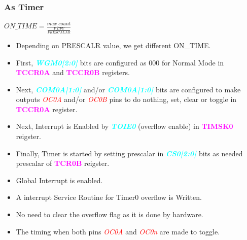 \documentclass{article}
\newcommand{\bitFormat}[1]{\emph{\textbf{\textcolor{cyan}{#1}}}}
\newcommand{\regFormat}[1]{\textbf{\textcolor{magenta}{#1}}}
\newcommand{\pinFormat}[1]{\emph{\textcolor{red}{#1}}}
\begin{document}
\subsubsection{As Timer}
\begin{center}
    $ON\_TIME = \frac{max\_count}{\frac{F\_CPU}{PRESCALAR}}$
\end{center}
\begin{itemize}
    \item Depending on PRESCALR value, we get different ON\_TIME.
    \item First, \bitFormat{WGM0[2:0]} bits are configured as 000 for Normal Mode in \regFormat{TCCR0A} and \regFormat{TCCR0B} registers.
    \item Next, \bitFormat{COM0A[1:0]} and/or \bitFormat{COM0A[1:0]} bits are configured to make outputs \pinFormat{OC0A} and/or \pinFormat{OC0B} pins to do nothing, set, clear or toggle in \regFormat{TCCR0A} register.
    \item Next, Interrupt is Enabled by \bitFormat{TOIE0} (overflow enable) in \regFormat{TIMSK0} reigster.
    \item Finally, Timer is started by setting prescalar in \bitFormat{CS0[2:0]} bits as needed prescalar of \regFormat{TCR0B} reigster.
    \item Global Interrupt is enabled.
    \item A interrupt Service Routine for Timer0 overflow is Written.
    \item No need to clear the overflow flag as it is done by hardware.
    \item The timing when both pins \pinFormat{OC0A} and \pinFormat{OC0n} are made to toggle.
\end{itemize}
\end{document}
